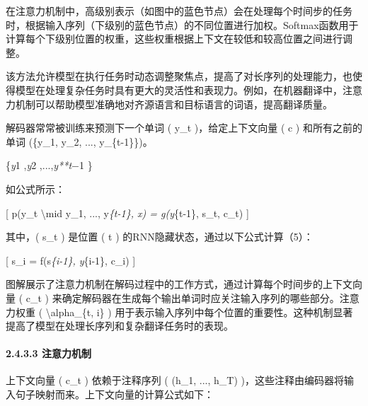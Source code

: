 
在注意力机制中，高级别表示（如图中的蓝色节点）会在处理每个时间步的任务时，根据输入序列（下级别的蓝色节点）的不同位置进行加权。Softmax函数用于计算每个下级别位置的权重，这些权重根据上下文在较低和较高位置之间进行调整。

该方法允许模型在执行任务时动态调整聚焦点，提高了对长序列的处理能力，也使得模型在处理复杂任务时具有更大的灵活性和表现力。例如，在机器翻译中，注意力机制可以帮助模型准确地对齐源语言和目标语言的词语，提高翻译质量。

解码器常常被训练来预测下一个单词 ( y\_t )，给定上下文向量 ( c )
和所有之前的单词 (\{y\_1, y\_2, ..., y\_\{t-1\}\})。

\{\emph{y}1 ,\emph{y}2 ,...,\emph{y**t}−1 \}

如公式所示：

{[} p(y\_t \textbackslash mid y\_1, ..., y\emph{\{t-1\}, x) =
g(y}\{t-1\}, s\_t, c\_t) {]}


其中，( s\_t ) 是位置 ( t ) 的RNN隐藏状态，通过以下公式计算（5）：

{[} s\_i = f(s\emph{\{i-1\}, y}\{i-1\}, c\_i) {]}


图解展示了注意力机制在解码过程中的工作方式，通过计算每个时间步的上下文向量
( c\_t )
来确定解码器在生成每个输出单词时应关注输入序列的哪些部分。注意力权重 (
\textbackslash alpha\_\{t, i\} )
用于表示输入序列中每个位置的重要性。这种机制显著提高了模型在处理长序列和复杂翻译任务时的表现。


\paragraph{\texorpdfstring{\textbf{2.4.3.3}
\textbf{注意力机制}}{2.4.3.3 注意力机制}}\label{2433-ux6ce8ux610fux529bux673aux5236}

上下文向量 ( c\_t ) 依赖于注释序列 ( (h\_1, ..., h\_T)
)，这些注释由编码器将输入句子映射而来。上下文向量的计算公式如下：


